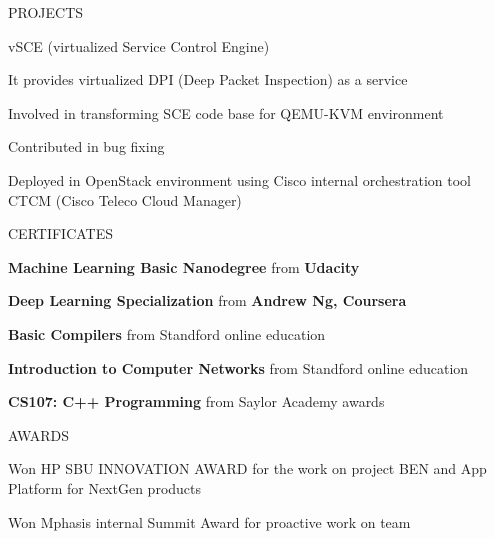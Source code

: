 \documentclass{resume} %
\begin{document}
\begin{rSection}{PROJECTS}
\begin{rSubsection}{vSCE (virtualized Service Control Engine)}
\vspace{-3pt}

\item It provides virtualized DPI (Deep Packet Inspection) as a service
\item Involved in transforming SCE code base for QEMU-KVM environment
\item Contributed in bug fixing
\item Deployed in OpenStack environment using Cisco internal orchestration tool CTCM (Cisco Teleco Cloud Manager)

\end{rSubsection}




\end{rSection} 

\vspace{-10pt}
\begin{rSection}{CERTIFICATES} \itemsep -1pt  

\begin{rSubsection}{}{ }{}    

\vspace{-8pt}

\item \textbf{Machine Learning Basic Nanodegree} from \textbf{Udacity}
\item \textbf{Deep Learning Specialization} from \textbf{Andrew Ng, Coursera}
\item \textbf{Basic Compilers} from Standford online education
\item \textbf{Introduction to Computer Networks} from Standford online education
\item \textbf{CS107: C++ Programming} from Saylor Academy awards
\end{rSubsection} 


\end{rSection}  


  
\begin{rSection}{AWARDS}

\begin{rSubsection}{}{}{}{}              
\item Won HP SBU INNOVATION AWARD for the work on project BEN and App Platform for NextGen products
\item Won Mphasis internal Summit Award for proactive work on team
\end{rSubsection}  

\end{rSection}
  
\end{document}
